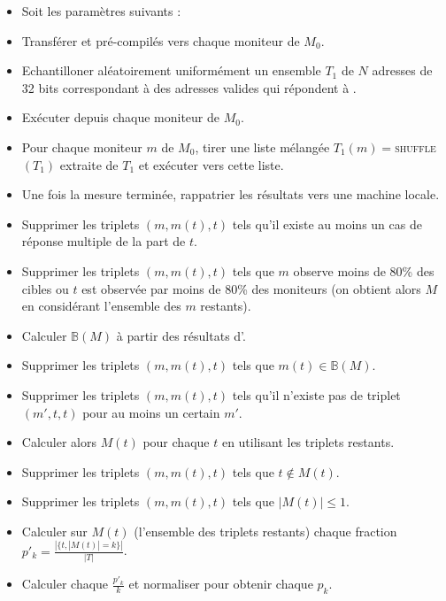\begin{itemize}
\item Soit les paramètres suivants :
\item Transférer \udpping et \udpexplore pré-compilés vers chaque moniteur de
$M_0$.
\item Echantilloner aléatoirement uniformément un ensemble $T_1$ de $N$
adresses de 32 bits correspondant à des adresses \ip valides qui répondent à
\udpping.
\item Exécuter \udpexplore depuis chaque moniteur de $M_0$.
\item Pour chaque moniteur $m$ de $M_0$, tirer une liste mélangée $T_1(m) =
$\textsc{shuffle} $(T_1)$ extraite de $T_1$ et exécuter \udpping vers cette
liste.
\item Une fois la mesure terminée, rappatrier les résultats vers une machine
locale.
\item Supprimer les triplets $(m, m(t), t)$ tels qu'il existe au moins un cas de
réponse multiple de la part de $t$.
\item Supprimer les triplets $(m, m(t), t)$ tels que $m$ observe moins de 80\%
des cibles ou $t$ est observée par moins de 80\% des moniteurs (on obtient
alors $M$ en considérant l'ensemble des $m$ restants).
\item Calculer ${\mathbb B}(M)$ à partir des résultats d'\udpexplore.
\item Supprimer les triplets $(m, m(t), t)$ tels que $m(t) \in {\mathbb B}(M)$.
\item Supprimer les triplets $(m, m(t), t)$ tels qu'il n'existe pas de triplet
$(m', t, t)$ pour au moins un certain $m'$.
\item Calculer alors $M(t)$ pour chaque $t$ en utilisant les triplets restants.
\item Supprimer les triplets $(m, m(t), t)$ tels que $t \notin M(t)$.
\item Supprimer les triplets $(m, m(t), t)$ tels que $|M(t)| \leq 1$.
\item Calculer sur $M(t)$ (l'ensemble des triplets restants) chaque fraction
$p'_k = \frac{|\{ t, |M(t)| = k \}|}{|T|}$.
\item Calculer chaque $\frac{p'_k}{k}$ et normaliser pour obtenir chaque $p_k$.
\end{itemize}


